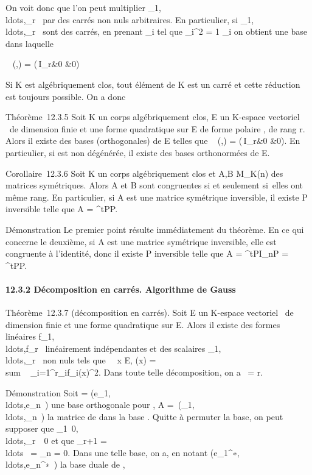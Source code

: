 \documentclass[]{article}
\begin{document}
On voit donc que l'on peut multiplier
\alpha_1,\\ldots,\alpha_r~
par des carrés non nuls arbitraires. En particulier, si
\alpha_1,\\ldots,\alpha_r~
sont des carrés, en prenant \lambda_i tel que \lambda_i^2
= 1 \over \alpha_i on obtient une base dans
laquelle

\mathrmMat~ (\phi,) =
\left
(\matrix\,I_r&0
 &0\right )

Si K est algébriquement clos, tout élément de K est un carré et cette
réduction est toujours possible. On a donc

Théorème~12.3.5 Soit K un corps algébriquement clos, E un K-espace
vectoriel ~de dimension finie et \Phi une forme quadratique sur E de forme
polaire \phi, de rang r. Alors il existe des bases (orthogonales) de E
telles que \mathrmMat~ (\phi,)
= \left
(\matrix\,I_r&0
 &0\right ). En particulier, si \Phi
est non dégénérée, il existe des bases orthonormées de E.

Corollaire~12.3.6 Soit K un corps algébriquement clos et A,B \in
M_K(n) des matrices symétriques. Alors A et B sont congruentes
si et seulement si~elles ont même rang. En particulier, si A est une
matrice symétrique inversible, il existe P inversible telle que A =
^tPP.

Démonstration Le premier point résulte immédiatement du théorème. En ce
qui concerne le deuxième, si A est une matrice symétrique inversible,
elle est congruente à l'identité, donc il existe P inversible telle que
A = ^tPI_nP = ^tPP.

\paragraph{12.3.2 Décomposition en carrés. Algorithme de Gauss}

Théorème~12.3.7 (décomposition en carrés). Soit E un K-espace vectoriel
~de dimension finie et \Phi une forme quadratique sur E. Alors il existe
des formes linéaires
f_1,\\ldots,f_r~
linéairement indépendantes et des scalaires
\alpha_1,\\ldots,\alpha_r~
non nuls tels que \forall~~x \in E, \Phi(x)
= \\sum ~
_i=1^r\alpha_if_i(x)^2. Dans toute
telle décomposition, on a
\mathrmrg~\Phi = r.

Démonstration Soit  =
(e_1,\\ldots,e_n~)
une base orthogonale pour \Phi, A =\
\mathrmdiag(\alpha_1,\\ldots,\alpha_n~)
la matrice de \Phi dans la base . Quitte à permuter la base, on peut
supposer que
\alpha_1\neq~0,\\ldots,\alpha_r\mathrel\neq~~0
et que \alpha_r+1 =
\\ldots~ =
\alpha_n = 0. Dans une telle base, on a, en notant
(e_1^∗,\\ldots,e_n^∗~)
la base duale de ,
\end{document}
